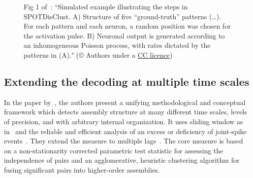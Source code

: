 \documentclass[brainsci, %
               review,submit,pdftex,moreauthors%
               ]{Definitions/mdpi}
\begin{document}
\begin{figure}
\centering
\caption{Fig 1 of~\citep{grossberger_unsupervised_2018}: ``Simulated example illustrating the steps in SPOTDisClust. A) Structure of five ``ground-truth'' patterns (\ldots). For each pattern and each neuron, a random position was chosen for the activation pulse. B) Neuronal output is generated according to an inhomogeneous Poisson process, with rates dictated by the patterns in (A)." (© Authors under a \href{https://journals.plos.org/ploscompbiol/article?id=10.1371/journal.pcbi.1006283}{CC licence})}\label{fig:G2018-1}
\end{figure}


\subsection{Extending the decoding at multiple time scales}

In the paper by~\citet{russo_cell_2017}, the authors present a unifying methodological and conceptual framework which detects assembly structure at many different time scales, levels of precision, and with arbitrary internal organization. It uses  sliding window as in~\citep{grun_unitary_2002} and the reliable and efficient analysis of an excess or deficiency of joint-spike events~\citep{pipa_neuroxidence_2008}. They extend the measure to multiple lags~\citep{torre_synchronous_2016}. The core measure is based on a non-stationarity corrected parametric test statistic for assessing the independence of pairs and an agglomerative, heuristic clustering algorithm for fusing significant pairs into higher-order assemblies. 
\end{document}

